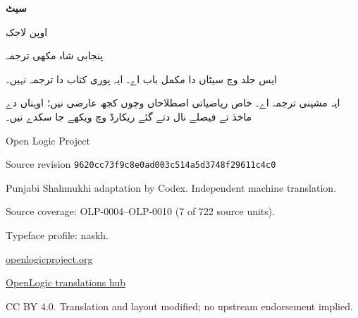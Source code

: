\documentclass[12pt,a4paper,oneside,openany]{book}
\begin{document}
\begin{titlepage}
\begin{Arabic}
\centering
\vspace*{18mm}
{\Huge\bfseries سیٹ\par}
\vspace{8mm}
{\LARGE اوپن لاجک\par}
\vspace{5mm}
{\Large پنجابی شاہ مکھی ترجمہ\par}
\vspace{16mm}
ایس جلد وچ سیٹاں دا مکمل باب اے۔ ایہ پوری کتاب دا ترجمہ نہیں۔
\par
ایہ مشینی ترجمہ اے۔ خاص ریاضیاتی اصطلاحاں وچوں کجھ عارضی نیں؛
اوہناں دے ماخذ تے فیصلے نال دتے گئے ریکارڈ وچ ویکھے جا سکدے نیں۔
\vfill
\end{Arabic}
\begin{center}
Open Logic Project\par
Source revision \texttt{9620cc73f9c8e0ad003c514a5d3748f29611c4c0}\par
Punjabi Shahmukhi adaptation by Codex. Independent machine translation.\par
Source coverage: OLP-0004--OLP-0010 (7 of 722 source units).\par
Typeface profile: naskh.\par
\href{https://openlogicproject.org/}{openlogicproject.org}\par
\href{https://github.com/KokunoYumeto/OpenLogic-translations}{OpenLogic translations hub}\par
CC BY 4.0. Translation and layout modified; no upstream endorsement implied.
\end{center}
\end{titlepage}
\mainmatter
\end{document}
